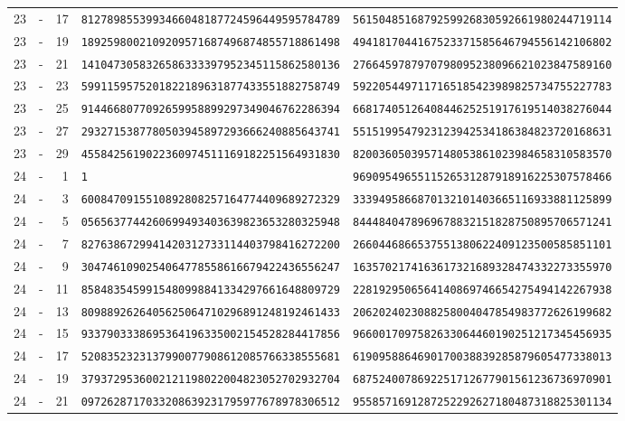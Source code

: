 \begin{longtable}{@{}rcrll@{}}
23&-&17&\texttt{8127898553993466048187724596449595784789}&\texttt{5615048516879259926830592661980244719114}\\
23&-&19&\texttt{1892598002109209571687496874855718861498}&\texttt{4941817044167523371585646794556142106802}\\
23&-&21&\texttt{1410473058326586333397952345115862580136}&\texttt{2766459787970798095238096621023847589160}\\
23&-&23&\texttt{5991159575201822189631877433551882758749}&\texttt{5922054497117165185423989825734755227783}\\
23&-&25&\texttt{9144668077092659958899297349046762286394}&\texttt{6681740512640844625251917619514038276044}\\
23&-&27&\texttt{2932715387780503945897293666240885643741}&\texttt{5515199547923123942534186384823720168631}\\
23&-&29&\texttt{4558425619022360974511169182251564931830}&\texttt{8200360503957148053861023984658310583570}\\
24&-&1&\texttt{1}&\texttt{9690954965511526531287918916225307578466}\\
24&-&3&\texttt{6008470915510892808257164774409689272329}&\texttt{3339495866870132101403665116933881125899}\\
24&-&5&\texttt{0565637744260699493403639823653280325948}&\texttt{8444840478969678832151828750895706571241}\\
24&-&7&\texttt{8276386729941420312733114403798416272200}&\texttt{2660446866537551380622409123500585851101}\\
24&-&9&\texttt{3047461090254064778558616679422436556247}&\texttt{1635702174163617321689328474332273355970}\\
24&-&11&\texttt{8584835459915480998841334297661648809729}&\texttt{2281929506564140869746654275494142267938}\\
24&-&13&\texttt{8098892626405625064710296891248192461433}&\texttt{2062024023088258004047854983772626199682}\\
24&-&15&\texttt{9337903338695364196335002154528284417856}&\texttt{9660017097582633064460190251217345456935}\\
24&-&17&\texttt{5208352323137990077908612085766338555681}&\texttt{6190958864690170038839285879605477338013}\\
24&-&19&\texttt{3793729536002121198022004823052702932704}&\texttt{6875240078692251712677901561236736970901}\\
24&-&21&\texttt{0972628717033208639231795977678978306512}&\texttt{9558571691287252292627180487318825301134}\\

\end{longtable}
